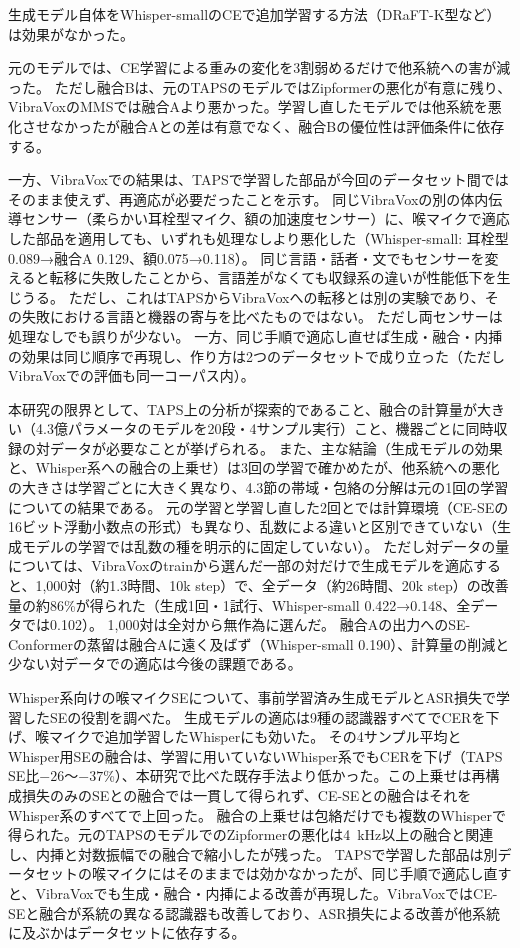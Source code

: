 \documentclass[xelatex,ja=standard,a4paper,twocolumn,10pt]{bxjsarticle}
\makeatletter
\renewcommand{\section}{\@startsection{section}{1}{\z@}{1.0ex plus .3ex}{.5ex}{\normalfont\large\sffamily\bfseries}}
\makeatother
\begin{document}
生成モデル自体をWhisper-smallのCEで追加学習する方法（DRaFT-K\cite{draft}型など）は効果がなかった。

元のモデルでは、CE学習による重みの変化を3割弱めるだけで他系統への害が減った。
ただし融合Bは、元のTAPSのモデルではZipformerの悪化が有意に残り、VibraVoxのMMSでは融合Aより悪かった。学習し直したモデルでは他系統を悪化させなかったが融合Aとの差は有意でなく、融合Bの優位性は評価条件に依存する。

一方、VibraVoxでの結果は、TAPSで学習した部品が今回のデータセット間ではそのまま使えず、再適応が必要だったことを示す。
同じVibraVoxの別の体内伝導センサー（柔らかい耳栓型マイク、額の加速度センサー）に、喉マイクで適応した部品を適用しても、いずれも処理なしより悪化した（Whisper-small: 耳栓型0.089→融合A 0.129、額0.075→0.118）。
同じ言語・話者・文でもセンサーを変えると転移に失敗したことから、言語差がなくても収録系の違いが性能低下を生じうる。
ただし、これはTAPSからVibraVoxへの転移とは別の実験であり、その失敗における言語と機器の寄与を比べたものではない。
ただし両センサーは処理なしでも誤りが少ない。
一方、同じ手順で適応し直せば生成・融合・内挿の効果は同じ順序で再現し、作り方は2つのデータセットで成り立った（ただしVibraVoxでの評価も同一コーパス内）。

本研究の限界として、TAPS上の分析が探索的であること、融合の計算量が大きい（4.3億パラメータのモデルを20段・4サンプル実行）こと、機器ごとに同時収録の対データが必要なことが挙げられる。
また、主な結論（生成モデルの効果と、Whisper系への融合の上乗せ）は3回の学習で確かめたが、他系統への悪化の大きさは学習ごとに大きく異なり、4.3節の帯域・包絡の分解は元の1回の学習についての結果である。
元の学習と学習し直した2回とでは計算環境（CE-SEの16ビット浮動小数点の形式）も異なり、乱数による違いと区別できていない（生成モデルの学習では乱数の種を明示的に固定していない）。
ただし対データの量については、VibraVoxのtrainから選んだ一部の対だけで生成モデルを適応すると、1,000対（約1.3時間、10k step）で、全データ（約26時間、20k step）の改善量の約86\%が得られた（生成1回・1試行、Whisper-small 0.422→0.148、全データでは0.102）。
1,000対は全対から無作為に選んだ。
融合Aの出力へのSE-Conformerの蒸留は融合Aに遠く及ばず（Whisper-small 0.190）、計算量の削減と少ない対データでの適応は今後の課題である。

\section{まとめ}
Whisper系向けの喉マイクSEについて、事前学習済み生成モデルとASR損失で学習したSEの役割を調べた。
生成モデルの適応は9種の認識器すべてでCERを下げ、喉マイクで追加学習したWhisperにも効いた。
その4サンプル平均とWhisper用SEの融合は、学習に用いていないWhisper系でもCERを下げ（TAPS SE比$-26$〜$-37$\%）、本研究で比べた既存手法より低かった。この上乗せは再構成損失のみのSEとの融合では一貫して得られず、CE-SEとの融合はそれをWhisper系のすべてで上回った。
融合の上乗せは包絡だけでも複数のWhisperで得られた。元のTAPSのモデルでのZipformerの悪化は4~kHz以上の融合と関連し、内挿と対数振幅での融合で縮小したが残った。
TAPSで学習した部品は別データセットの喉マイクにはそのままでは効かなかったが、同じ手順で適応し直すと、VibraVoxでも生成・融合・内挿による改善が再現した。VibraVoxではCE-SEと融合が系統の異なる認識器も改善しており、ASR損失による改善が他系統に及ぶかはデータセットに依存する。

\footnotesize
\let\oldbibitem\bibitem
\renewcommand{\bibitem}{\setlength{\itemsep}{0pt}\setlength{\parsep}{0pt}\oldbibitem}


\end{document}
